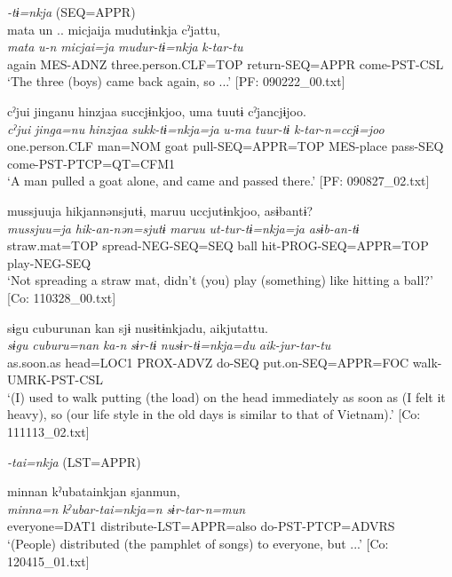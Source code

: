 \ea\label{ex:10.26}   
 \begin{xlist}
 \exi{} \textit{{}-tɨ=nkja} (SEQ=APPR)\\
  \ex  %
      \glll    mata  un ..  micjaija  mudutɨnkja  cˀjattu,\\
      \textit{mata}  \textit{u-n}  \textit{micjai=ja}  \textit{mudur-tɨ=nkja}  \textit{k-tar-tu}\\
      again  MES-ADNZ  three.person.CLF=TOP  return-SEQ=APPR  come-PST{}-CSL\\
      \glt       ‘The three (boys) came back again, so ...’ [PF: 090222\_00.txt]

  \ex  %
      \glll    cˀjui  jinganu  hinzjaa  succjɨnkjoo,  uma   tuutɨ  cˀjancjɨjoo.\\
      \textit{cˀjui}  \textit{jinga=nu}  \textit{hinzjaa}  \textit{sukk-tɨ=nkja=ja}  \textit{u-ma}  \textit{tuur-tɨ}  \textit{k-tar-n=ccjɨ=joo}\\
      one.person.CLF  man=NOM  goat  pull-SEQ=APPR=TOP  MES-place  pass-SEQ  come-PST-PTCP=QT=CFM1\\
      \glt       ‘A man pulled a goat alone, and came and passed there.’ [PF: 090827\_02.txt]

  \ex  %
      \glll    mussjuuja  hikjannənsjutɨ,  maruu  uccjutɨnkjoo,   asɨbantɨ?      \\
      \textit{mussjuu=ja}  \textit{hik-an-nən=sjutɨ}  \textit{maruu}  \textit{ut-tur-tɨ=nkja=ja} \textit{asɨb-an-tɨ}\\
      straw.mat=TOP  spread-NEG-SEQ=SEQ  ball  hit-PROG-SEQ=APPR=TOP  play-NEG-SEQ      \\
      \glt       ‘Not spreading a straw mat, didn’t (you) play (something) like hitting a ball?’ [Co: 110328\_00.txt]

  \ex  %
      \glll    sɨgu  cuburunan  kan  sjɨ  nusɨtɨnkjadu, aikjutattu.\\
      \textit{sɨgu}  \textit{cuburu=nan}  \textit{ka-n}  \textit{sɨr-tɨ}  \textit{nusɨr-tɨ=nkja=du}  \textit{aik-jur-tar-tu}\\
      as.soon.as  head=LOC1  PROX-ADVZ  do-SEQ  put.on-SEQ=APPR=FOC   walk-UMRK-PST-CSL\\
      \glt       ‘(I) used to walk putting (the load) on the head immediately as soon as (I felt it heavy), so (our life style in the old days is similar to that of Vietnam).’ [Co: 111113\_02.txt]

  \exi{} \textit{{}-tai=nkja} (LST=APPR)

  \ex  %
      \glll    minnan  kˀubatainkjan  sjanmun,\\
      \textit{minna=n}  \textit{kˀubar-tai=nkja=n}  \textit{sɨr-tar-n=mun}\\
      everyone=DAT1  distribute-LST=APPR=also  do-PST-PTCP=ADVRS\\
      \glt       ‘(People) distributed (the pamphlet of songs) to everyone, but ...’ [Co: 120415\_01.txt]
  \end{xlist}
\z

